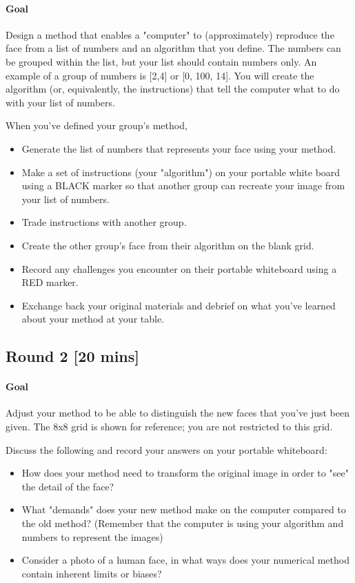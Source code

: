 \paragraph{Goal}Design a method that enables a "computer" to (approximately) reproduce the face from a list of numbers and an algorithm that you define. The numbers can be grouped within the list, but your list should contain numbers only. An example of a group of numbers is [2,4] or [0, 100, 14]. You will create the algorithm (or, equivalently, the instructions) that tell the computer what to do with your list of numbers. 

When you've defined your group's method, 
\begin{itemize}
    \item Generate the list of numbers that represents your face using your method. 
    \item Make a set of instructions (your "algorithm") on your portable white board using a BLACK marker so that another group can recreate your image from your list of numbers.  
    \item Trade instructions with another group.
    \item Create the other group's face from their algorithm on the blank grid. 
    \item Record any challenges you encounter on their portable whiteboard using a RED marker.
    \item Exchange back your original materials and debrief on what you've learned about your method at your table. 
\end{itemize}

\subsection{Round 2 [20 mins]}
\paragraph{Goal}Adjust your method to be able to distinguish the new faces that you've just been given.  The 8x8 grid is shown for reference; you are not restricted to this grid. 

Discuss the following and record your answers on your portable whiteboard:
\begin{itemize}
    \item How does your method need to transform the original image in order to "see" the detail of the  face?
    \item What "demands" does your new method make on the computer compared to the old method?  (Remember that the computer is using your algorithm and numbers to represent the images) 
    \item Consider a photo of a human face, in what ways does your numerical method contain inherent limits or biases? 
\end{itemize}

